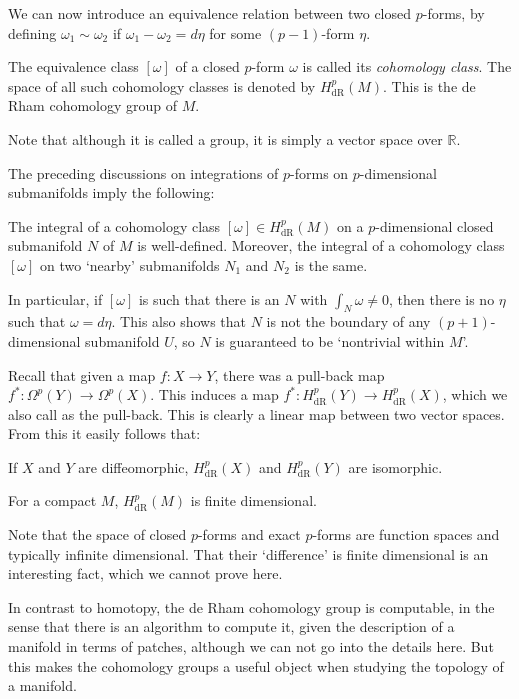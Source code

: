 \documentclass[12pt]{article}
\numberwithin{equation}{section}
\numberwithin{figure}{section}
\theoremstyle{remark}
\def\bR{\mathbb{R}}
\begin{document}
We can now introduce an equivalence relation between two closed $p$-forms, 
by defining $\omega_1\sim \omega_2$ if $\omega_1-\omega_2=d\eta$ for some $(p-1)$-form $\eta$.
\begin{definition}
  The equivalence class $[\omega]$ of a closed $p$-form $\omega$ is called its \emph{cohomology class}.
  The space of all such cohomology classes  is denoted by $H^p_\text{dR}(M)$.
  This is the de Rham cohomology group of $M$.
\end{definition}
Note that although it is called a group, it is simply a vector space over $\bR$.

The preceding discussions on integrations of $p$-forms on $p$-dimensional submanifolds imply the following:
\begin{proposition}
  The integral of a cohomology class $[\omega] \in H^p_\text{dR}(M)$ 
  on a $p$-dimensional closed submanifold $N$ of $M$ is well-defined.
  Moreover, the integral of a cohomology class $[\omega]$ on two `nearby' submanifolds $N_1$ and $N_2$ is the same.
\end{proposition}

In particular, if $[\omega]$ is such that there is an $N$ with $\int_N \omega\neq 0$,
then there is no $\eta$ such that $\omega=d\eta$.
This also shows that $N$ is not the boundary of any $(p+1)$-dimensional submanifold $U$,
so $N$ is guaranteed to be `nontrivial within $M$'.

Recall that given a map $f:X\to Y$, there was a pull-back map $f^*: \Omega^p(Y)\to \Omega^p(X)$.
This induces a map $f^*: H^p_\text{dR}(Y)\to H^p_\text{dR}(X)$,
which we also call as the pull-back.
This is clearly a linear map between two vector spaces. 
From this it easily follows that:
\begin{proposition}
  If $X$ and $Y$ are diffeomorphic, $H^p_\text{dR}(X)$ and $H^p_\text{dR}(Y)$ are isomorphic.
\end{proposition}

\begin{proposition}
  For a compact $M$, $H^p_\text{dR}(M)$ is finite dimensional.
\end{proposition}
Note that the space of closed $p$-forms and exact $p$-forms are function spaces
and typically infinite dimensional. 
That their `difference' is finite dimensional is an interesting fact,
which we cannot prove here.

In contrast to homotopy, the de Rham cohomology group is computable,
in the sense that there is an algorithm to compute it,
given the description of a manifold in terms of patches,
although we can not go into the details here.
But this makes the cohomology groups a useful object when studying the topology of a manifold.
\end{document}
